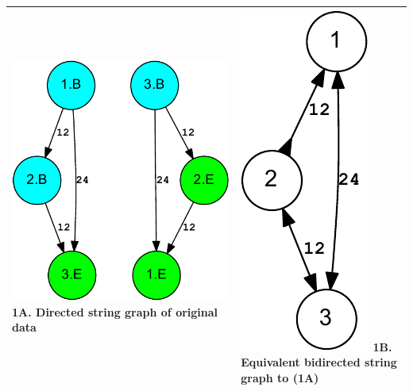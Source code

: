 \documentclass[letterpaper,12pt]{article}
\begin{document}
\newpage
\begin{tabular}{|p{}|p{}|} \hline
\includegraphics[scale=0.6]{out.digraph-crop.pdf}
\newline 1A. Directed string graph of original data
&
\includegraphics[scale=0.6]{out.bidigraph-crop.pdf}
\newline 1B. Equivalent bidirected string graph to (1A)
\\ \hline


\end{tabular}
\end{document}
